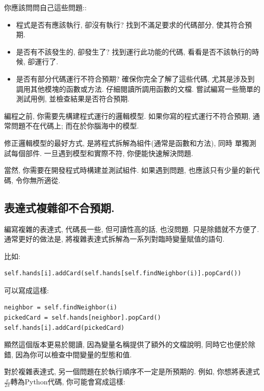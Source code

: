 \documentclass[10pt]{book}
\begin{document}
你應該問問自己這些問題::

\begin{itemize}

\item 程式是否有應該執行, 卻沒有執行?
找到不滿足要求的代碼部分, 使其符合預期. 

\item 是否有不該發生的, 卻發生了?
找到運行此功能的代碼, 看看是否不該執行的時候, 卻運行了. 

\item 是否有部分代碼運行不符合預期? 
確保你完全了解了這些代碼, 尤其是涉及到調用其他模塊的函數或方法. 
仔細閱讀所調用函數的文檔. 
嘗試編寫一些簡單的測試用例, 並檢查結果是否符合預期. 
\end{itemize}

編程之前, 你需要先構建程式運行的邏輯模型. 
如果你寫的程式運行不符合預期, 
通常問題不在代碼上; 而在於你腦海中的模型. 

修正邏輯模型的最好方式, 是將程式拆解為組件(通常是函數和方法), 同時
單獨測試每個部件. 
一旦遇到模型和實際不符, 你便能快速解決問題. 

當然, 你需要在開發程式時構建並測試組件. 
如果遇到問題, 也應該只有少量的新代碼, 令你無所適從. 


\subsection{表達式複雜卻不合預期.}

編寫複雜的表達式, 代碼長一些, 但可讀性高的話, 也沒問題.
只是除錯就不方便了. 
通常更好的做法是, 將複雜表達式拆解為一系列對臨時變量賦值的語句. 

比如:

\begin{verbatim}
self.hands[i].addCard(self.hands[self.findNeighbor(i)].popCard())
\end{verbatim}
%
可以寫成這樣:

\begin{verbatim}
neighbor = self.findNeighbor(i)
pickedCard = self.hands[neighbor].popCard()
self.hands[i].addCard(pickedCard)
\end{verbatim}
%

顯然這個版本更易於閱讀, 因為變量名稱提供了額外的文檔說明, 
同時它也便於除錯, 因為你可以檢查中間變量的型態和值. 

對於複雜表達式, 另一個問題在於執行順序不一定是所預期的. 
例如, 你想將表達式$\frac{x}{2 \pi}$轉為Python代碼, 
你可能會寫成這樣:
\end{document}
